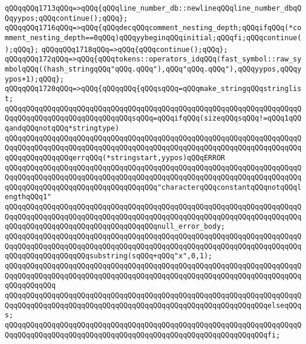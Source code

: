 \verb|qQQqqQQq1713qQQq=>qQQq{qQQqline_number_db::newlineqQQqline_number_dbqQQqyypos;qQQqcontinue();qQQq};|\newline
\verb|qQQqqQQq1716qQQq=>qQQq{qQQqdecqQQqcomment_nesting_depth;qQQqifqQQq(*comment_nesting_depth==0qQQq)qQQqyybeginqQQqinitial;qQQqfi;qQQqcontinue();qQQq};|\newline
\verb|qQQqqQQq1718qQQq=>qQQq{qQQqcontinue();qQQq};|\newline
\verb|qQQqqQQq172qQQq=>qQQq{qQQqtokens::operators_idqQQq(fast_symbol::raw_symbolqQQq((hash_stringqQQq"qQQq.qQQq"),qQQq"qQQq.qQQq"),qQQqyypos,qQQqyypos+1);qQQq};|\newline
\verb|qQQqqQQq1720qQQq=>qQQq{qQQqqQQq{qQQqsqQQq=qQQqmake_stringqQQqstringlist;|\newline
\verb|qQQqqQQqqQQqqQQqqQQqqQQqqQQqqQQqqQQqqQQqqQQqqQQqqQQqqQQqqQQqqQQqqQQqqQQqqQQqqQQqqQQqqQQqqQQqqQQqqQQqsqQQq=qQQqifqQQq(sizeqQQqsqQQq!=qQQq1qQQqandqQQqnotqQQq*stringtype)|\newline
\verb|qQQqqQQqqQQqqQQqqQQqqQQqqQQqqQQqqQQqqQQqqQQqqQQqqQQqqQQqqQQqqQQqqQQqqQQqqQQqqQQqqQQqqQQqqQQqqQQqqQQqqQQqqQQqqQQqqQQqqQQqqQQqqQQqqQQqqQQqqQQqqQQqqQQqqQQqqQQqerrqQQq(*stringstart,yypos)qQQqERROR|\newline
\verb|qQQqqQQqqQQqqQQqqQQqqQQqqQQqqQQqqQQqqQQqqQQqqQQqqQQqqQQqqQQqqQQqqQQqqQQqqQQqqQQqqQQqqQQqqQQqqQQqqQQqqQQqqQQqqQQqqQQqqQQqqQQqqQQqqQQqqQQqqQQqqQQqqQQqqQQqqQQqqQQqqQQqqQQqqQQqqQQq"characterqQQqconstantqQQqnotqQQqlengthqQQq1"|\newline
\verb|qQQqqQQqqQQqqQQqqQQqqQQqqQQqqQQqqQQqqQQqqQQqqQQqqQQqqQQqqQQqqQQqqQQqqQQqqQQqqQQqqQQqqQQqqQQqqQQqqQQqqQQqqQQqqQQqqQQqqQQqqQQqqQQqqQQqqQQqqQQqqQQqqQQqqQQqqQQqqQQqqQQqqQQqqQQqqQQqnull_error_body;|\newline
\verb|qQQqqQQqqQQqqQQqqQQqqQQqqQQqqQQqqQQqqQQqqQQqqQQqqQQqqQQqqQQqqQQqqQQqqQQqqQQqqQQqqQQqqQQqqQQqqQQqqQQqqQQqqQQqqQQqqQQqqQQqqQQqqQQqqQQqqQQqqQQqqQQqqQQqqQQqqQQqqQQqsubstring(sqQQq+qQQq"x",0,1);|\newline
\verb|qQQqqQQqqQQqqQQqqQQqqQQqqQQqqQQqqQQqqQQqqQQqqQQqqQQqqQQqqQQqqQQqqQQqqQQqqQQqqQQqqQQqqQQqqQQqqQQqqQQqqQQqqQQqqQQqqQQqqQQqqQQqqQQqqQQqqQQqqQQqqQQqqQQqqQQq|\newline
\verb|qQQqqQQqqQQqqQQqqQQqqQQqqQQqqQQqqQQqqQQqqQQqqQQqqQQqqQQqqQQqqQQqqQQqqQQqqQQqqQQqqQQqqQQqqQQqqQQqqQQqqQQqqQQqqQQqqQQqqQQqqQQqqQQqqQQqelseqQQqs;|\newline
\verb|qQQqqQQqqQQqqQQqqQQqqQQqqQQqqQQqqQQqqQQqqQQqqQQqqQQqqQQqqQQqqQQqqQQqqQQqqQQqqQQqqQQqqQQqqQQqqQQqqQQqqQQqqQQqqQQqqQQqqQQqqQQqqQQqqQQqfi;|\newline
